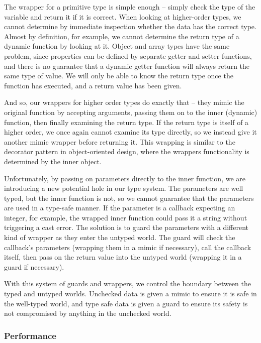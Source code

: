 \documentclass[12pt,a4paper,twoside,openright]{report}
\begin{document}
The wrapper for a primitive type is simple enough -- simply check the type of
the variable and return it if it is correct. When looking at higher-order
types, we cannot determine by immediate inspection whether the data has the
correct type. Almost by definition, for example, we cannot determine the return
type of a dynamic function by looking at it. Object and array types have the
same problem, since properties can be defined by separate getter and setter
functions, and there is no guarantee that a dynamic getter function will always
return the same type of value. We will only be able to know the return type
once the function has executed, and a return value has been given.

And so, our wrappers for higher order types do exactly that -- they mimic the
original function by accepting arguments, passing them on to the inner
(dynamic) function, then finally examining the return type. If the return type
is itself of a higher order, we once again cannot examine its type directly, so
we instead give it another mimic wrapper before returning it. This wrapping is
similar to the decorator pattern in object-oriented design, where the wrappers
functionality is determined by the inner object. 

Unfortunately, by passing on parameters directly to the inner function, we are
introducing a new potential hole in our type system. The parameters are well
typed, but the inner function is not, so we cannot guarantee that the
parameters are used in a type-safe manner. If the parameter is a callback
expecting an integer, for example, the wrapped inner function could pass it a
string without triggering a cast error. The solution is to guard the parameters
with a different kind of wrapper as they enter the untyped world. The guard
will check the callback's parameters (wrapping them in a mimic if necessary),
call the callback itself, then pass on the return value into the untyped world
(wrapping it in a guard if necessary). 

With this system of guards and wrappers, we control the boundary between the
typed and untyped worlds. Unchecked data is given a mimic to ensure it is safe
in the well-typed world, and type safe data is given a guard to ensure its
safety is not compromised by anything in the unchecked world.

\subsubsection{Performance}
\end{document}
